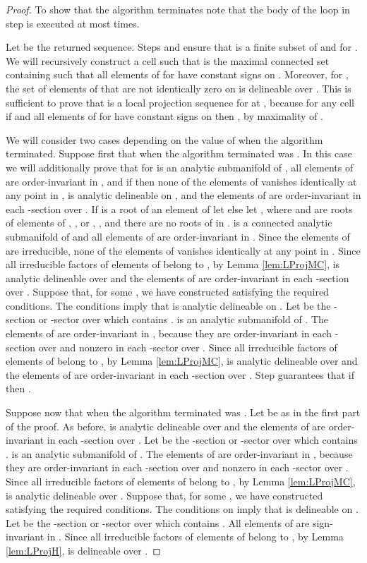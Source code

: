 \documentclass[english]{amsart}
\numberwithin{equation}{section}
\numberwithin{figure}{section}
\begin{document}
\begin{proof}
To show that the algorithm terminates note that the body of the loop
in step  is executed at most  times.

Let  be the returned sequence. Steps 
and  ensure that  is a finite subset of  and
 for . We
will recursively construct a cell  such
that  is the maximal connected set containing 
such that all elements of  for  have constant
signs on . Moreover, for , the set 
of elements of  that are not identically zero on 
is delineable over . This is sufficient to prove that 
is a local projection sequence for  at , because for any cell
 if  and all
elements of  for  have constant signs on 
then , by maximality of .

We will consider two cases depending on the value of  when the
algorithm terminated. Suppose first that when the algorithm terminated
 was . In this case we will additionally prove that for
  is an analytic submanifold of ,
all elements of  are order-invariant in , and if 
then none of the elements of  vanishes identically at any
point in ,  is analytic delineable on ,
and the elements of  are order-invariant in each -section
over . If  is a root of an element of  let
 else let , where 
and  are roots of elements of , , or ,
, and there are no roots of  in .
 is a connected analytic submanifold of 
and all elements of  are order-invariant in . Since
the elements of  are irreducible, none of the elements of
 vanishes identically at any point in . Since all
irreducible factors of elements of  belong
to , by Lemma \ref{lem:LProjMC},  is analytic delineable
over  and the elements of  are order-invariant in
each -section over . Suppose that, for some ,
we have constructed  satisfying the required conditions.
The conditions imply that  is analytic delineable on .
Let  be the -section or -sector over 
which contains .  is an analytic submanifold
of . The elements of  are order-invariant
in , because they are order-invariant in each -section
over  and nonzero in each -sector over .
Since all irreducible factors of elements of 
belong to  , by Lemma \ref{lem:LProjMC},
 is analytic delineable over  and the elements
of  are order-invariant in each -section
over . Step  guarantees that if  then .

Suppose now that when the algorithm terminated  was .
Let  be as in the first part of the proof. As before, 
is analytic delineable over  and the elements of 
are order-invariant in each -section over . Let 
be the -section or -sector over  which contains
.  is an analytic submanifold of .
The elements of  are order-invariant in , because
they are order-invariant in each -section over  and
nonzero in each -sector over . Since all irreducible
factors of elements of  belong to ,
by Lemma \ref{lem:LProjMC},  is analytic delineable over
. Suppose that, for some , we have constructed 
satisfying the required conditions. The conditions on  imply
that  is delineable on . Let  be the
-section or -sector over  which
contains . All elements of  are sign-invariant
in . Since all irreducible factors of elements of 
belong to  , by Lemma \ref{lem:LProjH},
 is delineable over .


\end{proof}
\end{document}
